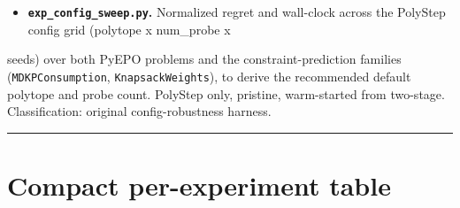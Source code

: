 \documentclass[10pt]{article}
\begin{document}
\begin{itemize}\setlength{\itemsep}{2pt}
\item \textbf{\texttt{exp\_config\_sweep.py}.} Normalized regret and wall-clock across the PolyStep config grid (polytope x num\_probe x
\end{itemize}
  seeds) over both PyEPO problems and the constraint-prediction families (\texttt{MDKPConsumption}, \texttt{KnapsackWeights}), to
  derive the recommended default polytope and probe count. PolyStep only, pristine, warm-started from two-stage.
  Classification: original config-robustness harness.

\medskip\hrule\medskip

\section*{Compact per-experiment table}
\end{document}
